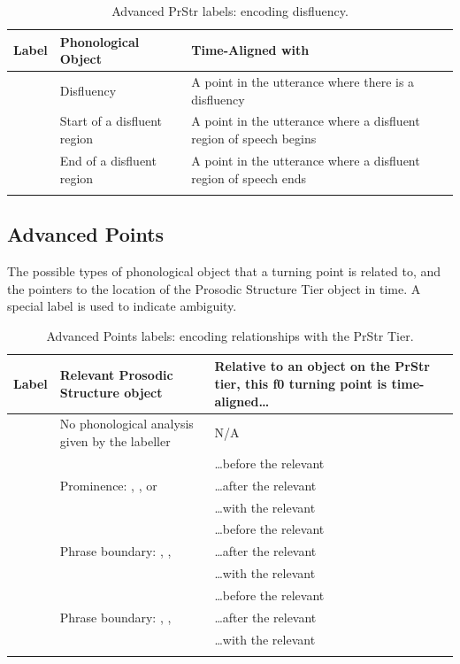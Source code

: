 \documentclass[11pt, twoside]{memoir}
\def\polar#1{{\relsize{-.5}\fontspec[Mapping=tex-text]{Roboto Mono}{#1}}}
\begin{document}
\begin{longtable}{cp{.3\linewidth}p{.45\linewidth}}
	\toprule
	\textbf{Label} & \textbf{Phonological Object} & \textbf{Time-Aligned with} \tabularnewline
	\midrule
	\endhead
	\polar{d} & Disfluency & A point in the utterance where there is a disfluency\tabularnewline
	\polar{\{d} & Start of a disfluent region & A point in the utterance where a disfluent region of speech begins\tabularnewline
	\polar{d\}} & End of a disfluent region & A point in the utterance where a disfluent region of speech ends\tabularnewline
	\bottomrule
	\caption{Advanced PrStr labels: encoding disfluency.}
\end{longtable}


\subsection*{Advanced Points}

The possible types of phonological object that a turning point is related to, and the pointers to the location of the Prosodic Structure Tier object in time. A special label is used to indicate ambiguity.

\begin{longtable}{c>{\centering}p{.33\linewidth}>{\centering\arraybackslash}p{.45\linewidth}} \toprule \textbf{Label} & \textbf{Relevant Prosodic Structure object} & \textbf{Relative to an object on the PrStr tier, this f0 turning point is time-aligned…}\tabularnewline
\midrule \endhead
\rowcolor{green}\polar{0} & No phonological analysis given by the labeller & N/A\tabularnewline
\midrule
\polar{*>} & & …before the relevant \polar{*}\tabularnewline
\polar{*<} & Prominence: \polar{*}, \polar{?*}, or \polar{**} & …after the relevant \polar{*}\tabularnewline
\polar{*@} & & …with the relevant \polar{*}\tabularnewline
\midrule
\polar{]>} & & …before the relevant \polar{]}\tabularnewline
\polar{]<} & Phrase boundary: \polar{]}, \polar{?]}, \polar{]]} & …after the relevant \polar{]}\tabularnewline
\polar{]@} & & …with the relevant \polar{]}\tabularnewline
\midrule
\polar{[>} & & …before the relevant \polar{[}\tabularnewline
\polar{[<} & Phrase boundary: \polar{[}, \polar{?[}, \polar{[[} & …after the relevant \polar{[}\tabularnewline
\polar{[@} & & …with the relevant \polar{[}\tabularnewline
\bottomrule
\caption{Advanced Points labels: encoding relationships with the PrStr Tier.}
\end{longtable}
\end{document}
